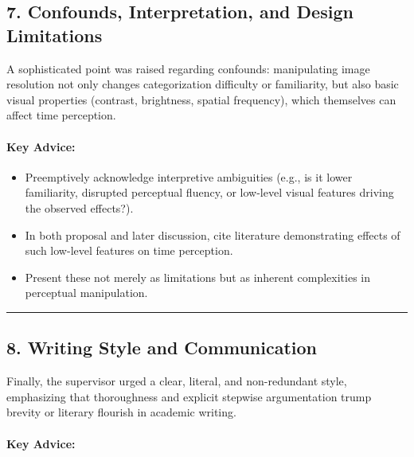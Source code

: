 \documentclass[
]{article}
\providecommand{\tightlist}{%
  \setlength{\itemsep}{0pt}\setlength{\parskip}{0pt}}
\begin{document}
\subsection{7. Confounds, Interpretation, and Design
Limitations}\label{confounds-interpretation-and-design-limitations}

A sophisticated point was raised regarding confounds: manipulating image
resolution not only changes categorization difficulty or familiarity,
but also basic visual properties (contrast, brightness, spatial
frequency), which themselves can affect time perception.

\paragraph{\texorpdfstring{\textbf{Key
Advice:}}{Key Advice:}}\label{key-advice-7}

\begin{itemize}
\tightlist
\item
  Preemptively acknowledge interpretive ambiguities (e.g., is it lower
  familiarity, disrupted perceptual fluency, or low-level visual
  features driving the observed effects?).
\item
  In both proposal and later discussion, cite literature demonstrating
  effects of such low-level features on time perception.
\item
  Present these not merely as limitations but as inherent complexities
  in perceptual manipulation.
\end{itemize}

\begin{center}\rule{0.5\linewidth}{0.5pt}\end{center}

\subsection{8. Writing Style and
Communication}\label{writing-style-and-communication}

Finally, the supervisor urged a clear, literal, and non-redundant style,
emphasizing that thoroughness and explicit stepwise argumentation trump
brevity or literary flourish in academic writing.

\paragraph{\texorpdfstring{\textbf{Key
Advice:}}{Key Advice:}}\label{key-advice-8}
\end{document}
